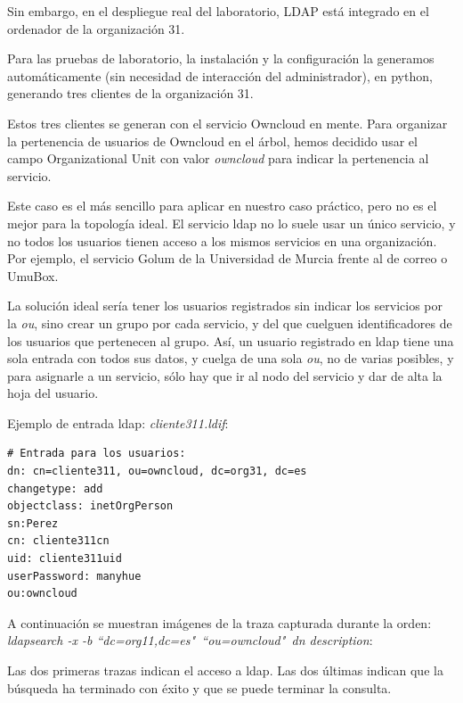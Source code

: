 \documentclass[]{article}
\begin{document}
Sin embargo, en el despliegue real del laboratorio, LDAP está integrado en el ordenador de la organización 31.

Para las pruebas de laboratorio, la instalación y la configuración la generamos automáticamente (sin necesidad de interacción del administrador), en python, generando tres clientes de la organización 31.

Estos tres clientes se generan con el servicio Owncloud en mente. Para organizar la pertenencia de usuarios de Owncloud en el árbol, hemos decidido usar el campo Organizational Unit con valor \textit{owncloud} para indicar la pertenencia al servicio.
                                                                                                                                                                                                                                                                     
Este caso es el más sencillo para aplicar en nuestro caso práctico, pero no es el mejor para la topología ideal. El servicio ldap no lo suele usar un único servicio, y no todos los usuarios tienen acceso a los mismos servicios en una organización. Por ejemplo, el servicio Golum de la Universidad de Murcia frente al de correo o UmuBox.

La solución ideal sería tener los usuarios registrados sin indicar los servicios por la \textit{ou}, sino crear un grupo por cada servicio, y del que cuelguen identificadores de los usuarios que pertenecen al grupo. Así, un usuario registrado en ldap tiene una sola entrada con todos sus datos, y cuelga de una sola \textit{ou}, no de varias posibles, y para asignarle a un servicio, sólo hay que ir al nodo del servicio y dar de alta la hoja del usuario.

Ejemplo de entrada ldap: \textit{cliente311.ldif}:

\begin{BVerbatim}
# Entrada para los usuarios:
dn: cn=cliente311, ou=owncloud, dc=org31, dc=es
changetype: add
objectclass: inetOrgPerson
sn:Perez
cn: cliente311cn
uid: cliente311uid
userPassword: manyhue
ou:owncloud
\end{BVerbatim}

A continuación se muestran imágenes de la traza capturada durante la orden: \textit{ldapsearch -x -b “dc=org11,dc=es"\ “ou=owncloud"\ dn description}:

Las dos primeras trazas indican el acceso a ldap. Las dos últimas indican que la búsqueda ha terminado con éxito y que se puede terminar la consulta.
\end{document}

